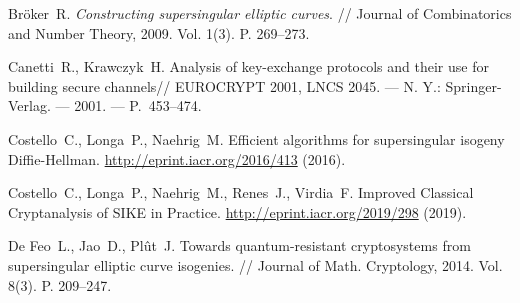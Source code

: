 \documentclass[a4paper,12pt]{article}
\theoremstyle{definition}
\begin{document}
\begin{thebibliography}{1}
 Bröker~R. {\it Constructing supersingular elliptic curves}. // Journal of Combinatorics and Number Theory, 2009. Vol. 1(3). P. 269--273.

Canetti~R., Krawczyk~H.
\newblock
\newblock Analysis of key-exchange protocols and their use for building secure
 channels// EUROCRYPT 2001, LNCS 2045.
\newblock --- N. Y.: Springer-Verlag.
\newblock --- 2001.
\newblock ---  P.~453--474.


 Costello~C., Longa~P., Naehrig~M. Efficient algorithms for supersingular isogeny Diffie-Hellman. \url{http://eprint.iacr.org/2016/413} (2016).


 Costello~C., Longa~P., Naehrig~M., Renes~J., Virdia~F. Improved Classical Cryptanalysis of SIKE in Practice. \url{http://eprint.iacr.org/2019/298} (2019).





 
 
   De Feo~L., Jao~D., Plût~J.   Towards quantum-resistant cryptosystems from supersingular elliptic curve isogenies.  // Journal of Math. Cryptology, 2014. Vol. 8(3). P. 209--247. 

%  





\end{thebibliography}
\end{document}
